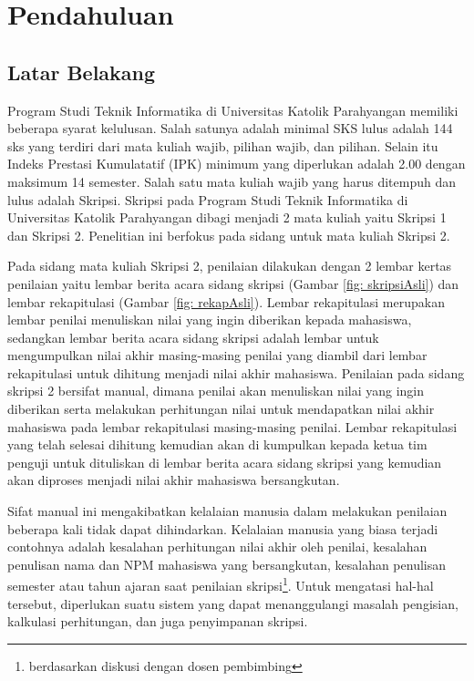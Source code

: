 \chapter{Pendahuluan}
\label{chap:pendahuluan}

\section{Latar Belakang}
\label{sec:latarBelakang}

	Program Studi Teknik Informatika di Universitas Katolik Parahyangan memiliki beberapa syarat kelulusan. Salah satunya adalah minimal SKS lulus adalah 144 sks yang terdiri dari mata kuliah wajib, pilihan wajib, dan pilihan. Selain itu Indeks Prestasi Kumulatatif (IPK) minimum  yang diperlukan adalah 2.00 dengan maksimum 14 semester. Salah satu mata kuliah wajib yang harus ditempuh dan lulus adalah Skripsi. Skripsi pada Program Studi Teknik Informatika di Universitas Katolik Parahyangan dibagi menjadi 2 mata kuliah yaitu Skripsi 1 dan Skripsi 2. Penelitian ini berfokus pada sidang untuk mata kuliah Skripsi 2.
	
	Pada sidang mata kuliah Skripsi 2, penilaian dilakukan dengan 2 lembar kertas penilaian yaitu lembar berita acara sidang skripsi (Gambar \ref{fig: skripsiAsli}) dan lembar rekapitulasi (Gambar \ref{fig: rekapAsli}). Lembar rekapitulasi merupakan lembar penilai menuliskan nilai yang ingin diberikan kepada mahasiswa, sedangkan lembar berita acara sidang skripsi adalah lembar untuk mengumpulkan nilai akhir masing-masing penilai yang diambil dari lembar rekapitulasi untuk dihitung menjadi nilai akhir mahasiswa. Penilaian pada sidang skripsi 2 bersifat manual, dimana penilai akan menuliskan nilai yang ingin diberikan serta melakukan perhitungan nilai untuk mendapatkan nilai akhir mahasiswa pada lembar rekapitulasi masing-masing penilai. Lembar rekapitulasi yang telah selesai dihitung kemudian akan di kumpulkan kepada ketua tim penguji untuk dituliskan di lembar berita acara sidang skripsi yang kemudian akan diproses menjadi nilai akhir mahasiswa bersangkutan.
	
	Sifat manual ini mengakibatkan kelalaian manusia dalam melakukan penilaian beberapa kali tidak dapat dihindarkan. Kelalaian manusia yang biasa terjadi contohnya adalah kesalahan perhitungan nilai akhir oleh penilai, kesalahan penulisan nama dan NPM mahasiswa yang bersangkutan, kesalahan penulisan semester atau tahun ajaran saat penilaian skripsi\footnote{berdasarkan diskusi dengan dosen pembimbing}. Untuk mengatasi hal-hal tersebut, diperlukan suatu sistem yang dapat menanggulangi masalah pengisian, kalkulasi perhitungan, dan juga penyimpanan skripsi.
	
